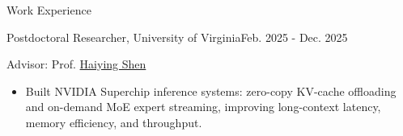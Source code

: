 \documentclass{resume} %
\begin{document}
\begin{rSection}{Work Experience}
\begin{rSubsection}{Postdoctoral Researcher, University of Virginia}{Feb. 2025 - Dec. 2025} {}{}
\item[]
Advisor: Prof. \href{https://www.cs.virginia.edu/~hs6ms/}{Haiying Shen}
\begin{itemize}
  \item Built NVIDIA Superchip inference systems: zero-copy KV-cache offloading and on-demand MoE expert streaming, improving long-context latency, memory efficiency, and throughput.
\end{itemize}
\end{rSubsection}
\vspace{-0.5em}


\end{rSection}
\end{document}
